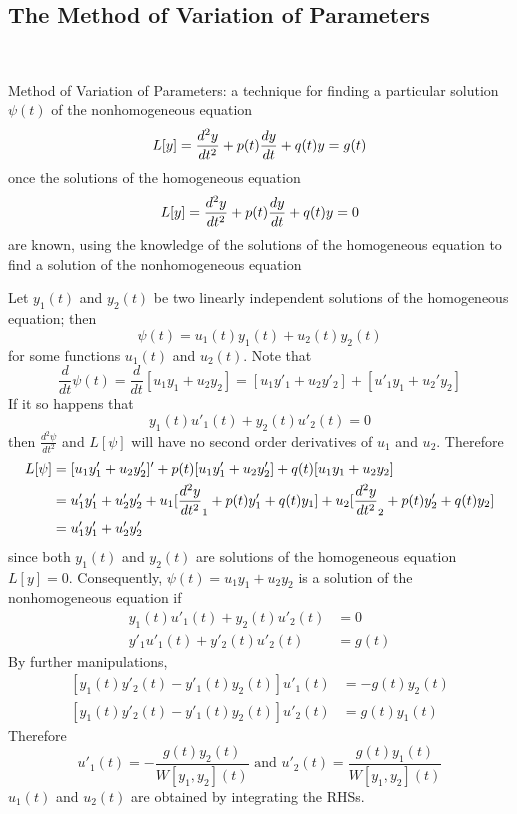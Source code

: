 \documentclass[12pt]{article}
\begin{document}
\subsection{The Method of Variation of Parameters} \
\begin{definition} Method of Variation of Parameters: a technique for finding a particular solution $\psi(t)$ of the nonhomogeneous equation $$L[y] = \frac{d^2y}{dt^2} + p(t)\frac{dy}{dt} + q(t)y = g(t)$$ once the solutions of the homogeneous equation $$L[y] = \frac{d^2y}{dt^2} + p(t)\frac{dy}{dt} + q(t)y = 0$$ are known, using the knowledge of the solutions of the homogeneous equation to find a solution of the nonhomogeneous equation \end{definition} 
Let $y_1(t)$ and $y_2(t)$ be two linearly independent solutions of the homogeneous equation; then $$\psi(t) = u_1(t)y_1(t) + u_2(t)y_2(t)$$ for some functions $u_1(t)$ and $u_2(t)$. Note that $$\frac{d}{dt} \psi(t) = \frac{d}{dt} [u_1y_1 + u_2y_2] = [u_1y'_1 + u_2y'_2] + [u'_1y_1 + u_2'y_2] $$ If it so happens that $$y_1(t)u'_1(t) + y_2(t)u'_2(t) = 0$$ then $\frac{d^2 \psi}{dt^2}$ and $L[\psi]$ will have no second order derivatives of $u_1$ and $u_2$. Therefore $$\begin{aligned} L[\psi] &= [u_1y'_1 + u_2y'_2]' + p(t)[u_1y'_1 + u_2y'_2] + q(t)[u_1y_1 + u_2y_2] \\ &= u'_1y'_1 + u'_2y'_2 + u_1[\frac{d^2y}{dt^2}_1 + p(t)y'_1 + q(t)y_1] + u_2[\frac{d^2y}{dt^2}_2 + p(t)y'_2 + q(t)y_2] \\ &= u'_1y'_1 + u'_2y'_2 \end{aligned}$$ since both $y_1(t)$ and $y_2(t)$ are solutions of the homogeneous equation $L[y] = 0$. Consequently, $\psi(t) = u_1y_1 + u_2y_2$ is a solution of the nonhomogeneous equation if $$\begin{aligned} y_1(t)u'_1(t) + y_2(t)u'_2(t) &= 0 \\ y'_1u'_1(t) + y'_2(t)u'_2(t) &= g(t) \end{aligned} $$ By further manipulations, $$\begin{aligned} [y_1(t)y'_2(t) - y'_1(t)y_2(t)]u'_1(t) &= -g(t)y_2(t) \\ [y_1(t)y'_2(t) - y'_1(t)y_2(t)]u'_2(t) &= g(t)y_1(t) \end{aligned} $$ 
Therefore $$ u'_1(t) = -\frac{g(t)y_2(t)}{W[y_1, y_2](t)} \text{ and } u'_2(t) = \frac{g(t)y_1(t)}{W[y_1, y_2](t)} $$ $u_1(t)$ and $u_2(t)$ are obtained by integrating the RHSs. 
\end{document}
